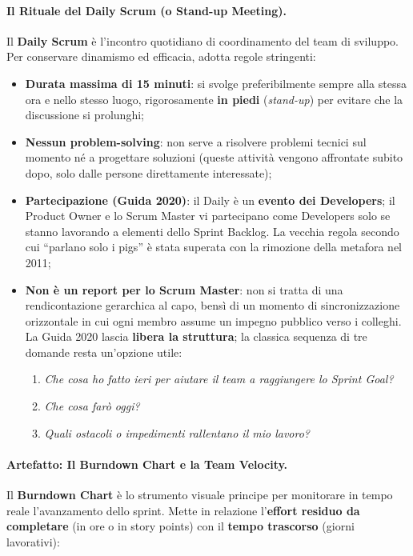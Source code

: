 \documentclass[12pt]{extarticle}
\begin{document}
\paragraph{Il Rituale del Daily Scrum (o Stand-up Meeting).}
Il \textbf{Daily Scrum} è l'incontro quotidiano di coordinamento del team di sviluppo. Per conservare dinamismo ed efficacia, adotta regole stringenti:
\begin{itemize}
    \item \textbf{Durata massima di 15 minuti}: si svolge preferibilmente sempre alla stessa ora e nello stesso luogo, rigorosamente \textbf{in piedi} (\textit{stand-up}) per evitare che la discussione si prolunghi;
    \item \textbf{Nessun problem-solving}: non serve a risolvere problemi tecnici sul momento né a progettare soluzioni (queste attività vengono affrontate subito dopo, solo dalle persone direttamente interessate);
    \item \textbf{Partecipazione (Guida 2020)}: il Daily è un \textbf{evento dei Developers}; il Product Owner e lo Scrum Master vi partecipano come Developers solo se stanno lavorando a elementi dello Sprint Backlog. La vecchia regola secondo cui ``parlano solo i pigs'' è stata superata con la rimozione della metafora nel 2011;
    \item \textbf{Non è un report per lo Scrum Master}: non si tratta di una rendicontazione gerarchica al capo, bensì di un momento di sincronizzazione orizzontale in cui ogni membro assume un impegno pubblico verso i colleghi. La Guida 2020 lascia \textbf{libera la struttura}; la classica sequenza di tre domande resta un'opzione utile:
    \begin{enumerate}
        \item \textit{Che cosa ho fatto ieri per aiutare il team a raggiungere lo Sprint Goal?}
        \item \textit{Che cosa farò oggi?}
        \item \textit{Quali ostacoli o impedimenti rallentano il mio lavoro?}
    \end{enumerate}
\end{itemize}

\paragraph{Artefatto: Il Burndown Chart e la Team Velocity.}
Il \textbf{Burndown Chart} è lo strumento visuale principe per monitorare in tempo reale l'avanzamento dello sprint. Mette in relazione l'\textbf{effort residuo da completare} (in ore o in story points) con il \textbf{tempo trascorso} (giorni lavorativi):
\end{document}
